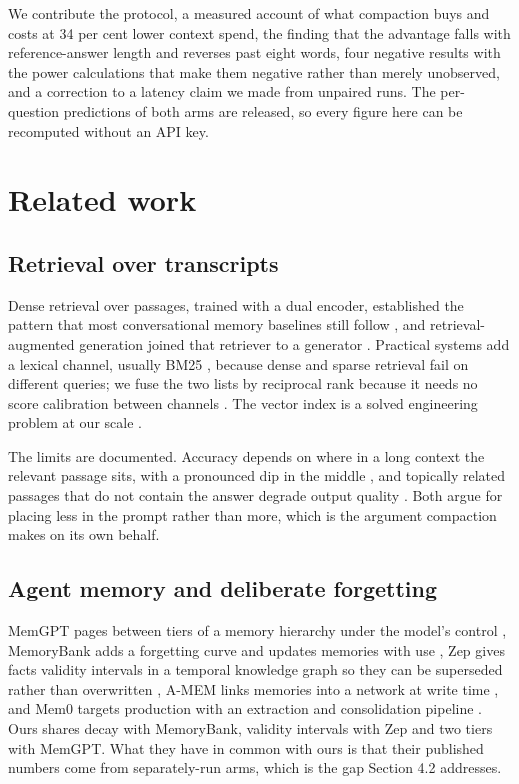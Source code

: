 \documentclass[10pt,a4paper,twocolumn]{article}
\begin{document}
We contribute the protocol, a measured account of what compaction buys and costs at 34 per cent lower context spend, the finding that the advantage falls with reference-answer length and reverses past eight words, four negative results with the power calculations that make them negative rather than merely unobserved, and a correction to a latency claim we made from unpaired runs. The per-question predictions of both arms are released, so every figure here can be recomputed without an API key.

\section{Related work}

\subsection{Retrieval over transcripts}

Dense retrieval over passages, trained with a dual encoder, established the pattern that most conversational memory baselines still follow \citep{karpukhin2020,reimers2019}, and retrieval-augmented generation joined that retriever to a generator \citep{lewis2020}. Practical systems add a lexical channel, usually BM25 \citep{robertson2009}, because dense and sparse retrieval fail on different queries; we fuse the two lists by reciprocal rank because it needs no score calibration between channels \citep{cormack2009}. The vector index is a solved engineering problem at our scale \citep{malkov2020,johnson2021}.

The limits are documented. Accuracy depends on where in a long context the relevant passage sits, with a pronounced dip in the middle \citep{liu2024}, and topically related passages that do not contain the answer degrade output quality \citep{cuconasu2024}. Both argue for placing less in the prompt rather than more, which is the argument compaction makes on its own behalf.

\subsection{Agent memory and deliberate forgetting}

MemGPT pages between tiers of a memory hierarchy under the model's control \citep{packer2023}, MemoryBank adds a forgetting curve and updates memories with use \citep{zhong2024}, Zep gives facts validity intervals in a temporal knowledge graph so they can be superseded rather than overwritten \citep{rasmussen2025}, A-MEM links memories into a network at write time \citep{xu2025}, and Mem0 targets production with an extraction and consolidation pipeline \citep{chhikara2025}. Ours shares decay with MemoryBank, validity intervals with Zep and two tiers with MemGPT. What they have in common with ours is that their published numbers come from separately-run arms, which is the gap Section 4.2 addresses.
\end{document}
